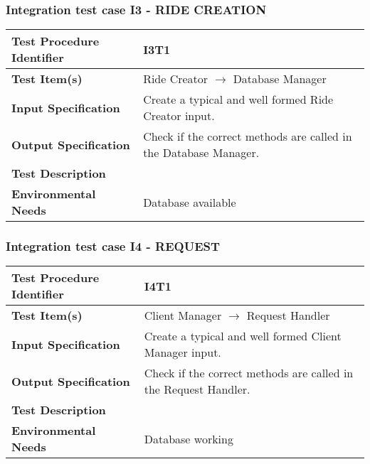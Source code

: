 \hfill \newline \newline 
\subsubsection{Integration test case I3 - RIDE CREATION }
 \begin{tabular}{l p{}}
    \hline
    \textbf{Test Procedure Identifier} & I3T1 \\
    \hline
    \textbf{Test Item(s)} & Ride Creator	  $\rightarrow$ Database Manager\\
    \hline
    \textbf{Input Specification} &  Create a typical and well formed Ride Creator input.  \\
    \hline
    \textbf{Output Specification} & Check if the correct methods are called in the Database Manager.\\
    \hline
    \textbf{Test Description} & \\
    \hline
    \textbf{Environmental Needs} &  Database available\\
    \hline
    \end{tabular}

\hfill \newline \newline 
\subsubsection{Integration test case I4 - REQUEST}
 \begin{tabular}{l p{}}
    \hline
    \textbf{Test Procedure Identifier} & I4T1 \\
    \hline
    \textbf{Test Item(s)} & Client Manager $\rightarrow$ Request Handler \\
    \hline
    \textbf{Input Specification} & Create a typical and well formed Client Manager input.  \\
    \hline
    \textbf{Output Specification} & Check if the correct methods are called in the Request Handler. \\
    \hline
    \textbf{Test Description} & \\
    \hline
    \textbf{Environmental Needs} &  Database working\\
    \hline
    \end{tabular}
\hfill \newline \newline 
